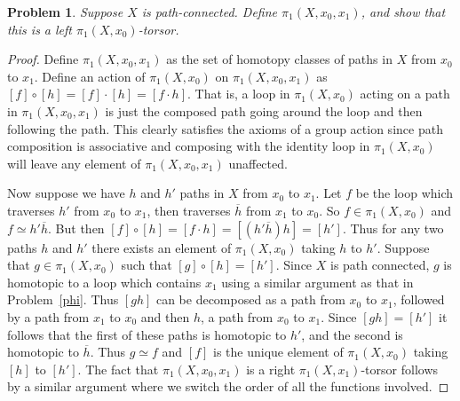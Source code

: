 \documentclass{article}
\newtheorem{problem}{Problem}
\begin{document}
\begin{problem}
Suppose $X$ is path-connected. Define $\pi_1(X,x_0,x_1)$, and show that this is a left $\pi_1(X,x_0)$-torsor.
\end{problem}
\begin{proof}
Define $\pi_1(X,x_0,x_1)$ as the set of homotopy classes of paths in $X$ from $x_0$ to $x_1$. Define an action of $\pi_1(X,x_0)$ on $\pi_1(X,x_0,x_1)$ as $[f] \circ [h] = [f] \cdot [h] = [f \cdot h]$. That is, a loop in $\pi_1(X,x_0)$ acting on a path in $\pi_1(X,x_0,x_1)$ is just the composed path going around the loop and then following the path. This clearly satisfies the axioms of a group action since path composition is associative and composing with the identity loop in $\pi_1(X,x_0)$ will leave any element of $\pi_1(X,x_0,x_1)$ unaffected.

Now suppose we have $h$ and $h'$ paths in $X$ from $x_0$ to $x_1$. Let $f$ be the loop which traverses $h'$ from $x_0$ to $x_1$, then traverses $\overline{h}$ from $x_1$ to $x_0$. So $f \in \pi_1(X,x_0)$ and $f \simeq h'\overline{h}$. But then $[f] \circ [h] = [f \cdot h] = [(h' \overline{h})h] = [h']$. Thus for any two paths $h$ and $h'$ there exists an element of $\pi_1(X,x_0)$ taking $h$ to $h'$.
\vspace{100pt}
Suppose that $g \in \pi_1(X,x_0)$ such that $[g] \circ [h] = [h']$. Since $X$ is path connected, $g$ is homotopic to a loop which contains $x_1$ using a similar argument as that in Problem~\ref{phi}. Thus $[gh]$ can be decomposed as a path from $x_0$ to $x_1$, followed by a path from $x_1$ to $x_0$ and then $h$, a path from $x_0$ to $x_1$. Since $[gh] = [h']$ it follows that the first of these paths is homotopic to $h'$, and the second is homotopic to $\overline{h}$.
\vspace{100pt}
Thus $g \simeq f$ and $[f]$ is the unique element of $\pi_1(X,x_0)$ taking $[h]$ to $[h']$. The fact that $\pi_1(X,x_0,x_1)$ is a right $\pi_1(X,x_1)$-torsor follows by a similar argument where we switch the order of all the functions involved.
\end{proof}
\end{document}
